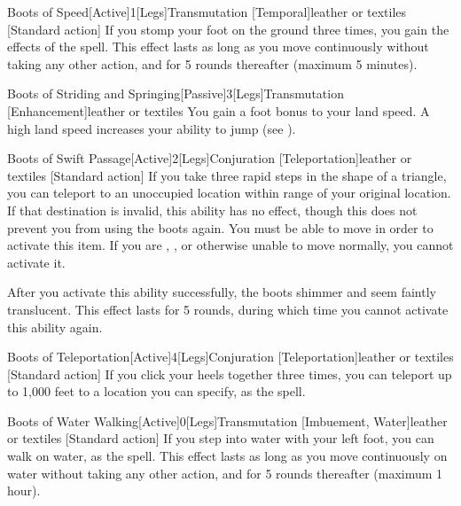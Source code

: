         \begin{magicitemdef}{Boots of Speed}[Active]{1}[Legs]{Transmutation [Temporal]}{leather or textiles}
            [Standard action] If you stomp your foot on the ground three times, you gain the effects of the  spell.
            This effect lasts as long as you move continuously without taking any other action, and for 5 rounds thereafter (maximum 5 minutes).
        \end{magicitemdef}

        \begin{magicitemdef}{Boots of Striding and Springing}[Passive]{3}[Legs]{Transmutation [Enhancement]}{leather or textiles}
             You gain a  foot bonus to your land speed.
            A high land speed increases your ability to jump (see ).
        \end{magicitemdef}

        \begin{magicitemdef}{Boots of Swift Passage}[Active]{2}[Legs]{Conjuration [Teleportation]}{leather or textiles}
            [Standard action] If you take three rapid steps in the shape of a triangle, you can teleport to an unoccupied location within \rngmed range of your original location.
            If that destination is invalid, this ability has no effect, though this does not prevent you from using the boots again.
            You must be able to move in order to activate this item.
            If you are \grappled, \immobilized, or otherwise unable to move normally, you cannot activate it.

            After you activate this ability successfully, the boots shimmer and seem faintly translucent.
            This effect lasts for 5 rounds, during which time you cannot activate this ability again.
        \end{magicitemdef}

        \begin{magicitemdef}{Boots of Teleportation}[Active]{4}[Legs]{Conjuration [Teleportation]}{leather or textiles}
            [Standard action] If you click your heels together three times, you can teleport up to 1,000 feet to a location you can specify, as the  spell.
        \end{magicitemdef}

        \begin{magicitemdef}{Boots of Water Walking}[Active]{0}[Legs]{Transmutation [Imbuement, Water]}{leather or textiles}
            [Standard action] If you step into water with your left foot, you can walk on water, as the  spell.
            This effect lasts as long as you move continuously on water without taking any other action, and for 5 rounds thereafter (maximum 1 hour).
        \end{magicitemdef}

